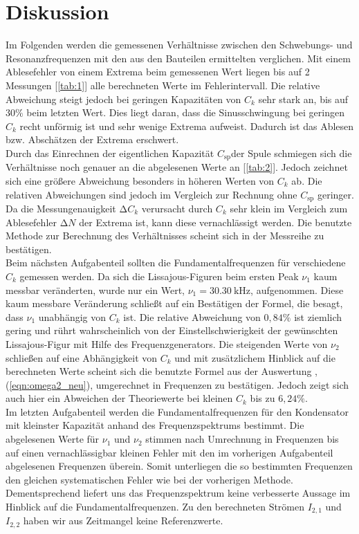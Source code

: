 \section{Diskussion}
\label{sec:Diskussion}
Im Folgenden werden die gemessenen Verhältnisse zwischen den Schwebungs- und Resonanzfrequenzen mit den aus den Bauteilen ermittelten verglichen.
Mit einem Ablesefehler von einem Extrema beim gemessenen Wert liegen bis auf 2 Messungen [\ref{tab:1}] alle berechneten Werte im Fehlerintervall.
Die relative Abweichung steigt jedoch bei geringen Kapazitäten von $C_k$ sehr stark an, bis auf $30\%$ beim letzten Wert.
Dies liegt daran, dass die Sinusschwingung bei geringen $C_k$ recht unförmig ist und sehr wenige Extrema aufweist.
Dadurch ist das Ablesen bzw. Abschätzen der Extrema erschwert.\\
Durch das Einrechnen der eigentlichen Kapazität $C_{\text{sp}}$der Spule schmiegen sich die Verhältnisse noch genauer an die abgelesenen Werte an [\ref{tab:2}].
Jedoch zeichnet sich eine größere Abweichung besonders in höheren Werten von $C_k$ ab.
Die relativen Abweichungen sind jedoch im Vergleich zur Rechnung ohne $C_{\text{sp}}$ geringer.\\
Da die Messungenauigkeit $\increment C_k$ verursacht durch $C_k$ sehr klein im Vergleich zum Ablesefehler $\increment N$ der Extrema ist, kann diese vernachlässigt werden.
Die benutzte Methode zur Berechnung des Verhältnisses scheint sich in der Messreihe zu bestätigen.\\
Beim nächsten Aufgabenteil sollten die Fundamentalfrequenzen für verschiedene $C_k$ gemessen werden.
Da sich die Lissajous-Figuren beim ersten Peak $\nu_1$ kaum messbar veränderten, wurde nur ein Wert, $\nu_1 = \SI{30.30}{\kilo\hertz}$, aufgenommen.
Diese kaum messbare Veränderung schließt auf ein Bestätigen der Formel, die besagt, dass $\nu_1$ unabhängig von $C_k$ ist.
Die relative Abweichung von $0,84\%$ ist ziemlich gering und rührt wahrscheinlich von der Einstellschwierigkeit der gewünschten Lissajous-Figur mit Hilfe des Frequenzgenerators.
Die steigenden Werte von $\nu_2$ schließen auf eine Abhängigkeit von $C_k$ und mit zusätzlichem Hinblick auf die berechneten Werte scheint sich die benutzte Formel aus der Auswertung , (\ref{eqn:omega2_neu}), umgerechnet in Frequenzen zu bestätigen.
Jedoch zeigt sich auch hier ein Abweichen der Theoriewerte bei kleinen $C_k$ bis zu $6,24\%$.\\
Im letzten Aufgabenteil werden die Fundamentalfrequenzen für den Kondensator mit kleinster Kapazität anhand des Frequenzspektrums bestimmt.
Die abgelesenen Werte für $\nu_1$ und $\nu_2$ stimmen nach Umrechnung in Frequenzen bis auf einen vernachlässigbar kleinen Fehler mit den im vorherigen Aufgabenteil abgelesenen Frequenzen überein.
Somit unterliegen die so bestimmten Frequenzen den gleichen systematischen Fehler wie bei der vorherigen Methode.
Dementsprechend liefert uns das Frequenzspektrum keine verbesserte Aussage im Hinblick auf die Fundamentalfrequenzen.
Zu den berechneten Strömen $I_{2,1}$ und $I_{2,2}$ haben wir aus Zeitmangel keine Referenzwerte.
